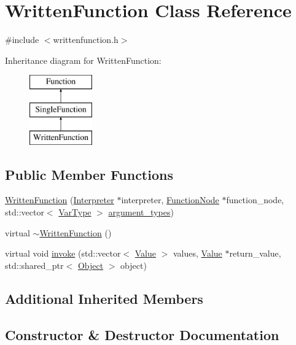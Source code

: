 \hypertarget{classWrittenFunction}{}\section{Written\+Function Class Reference}
\label{classWrittenFunction}


{\ttfamily \#include $<$writtenfunction.\+h$>$}

Inheritance diagram for Written\+Function\+:\begin{figure}[H]
\begin{center}
\leavevmode
\includegraphics[height=3.000000cm]{classWrittenFunction}
\end{center}
\end{figure}
\subsection*{Public Member Functions}
\begin{DoxyCompactItemize}
\item 
\hyperlink{classWrittenFunction_a39130c6e2a72622dfbe1a81ec07d5e4a}{Written\+Function} (\hyperlink{classInterpreter}{Interpreter} $\ast$interpreter, \hyperlink{classFunctionNode}{Function\+Node} $\ast$function\+\_\+node, std\+::vector$<$ \hyperlink{classVarType}{Var\+Type} $>$ \hyperlink{classSingleFunction_a345cc7c6a42587a62495688af6644a26}{argument\+\_\+types})
\item 
virtual \hyperlink{classWrittenFunction_a46facc10f998146c7709772b0b662ad6}{$\sim$\+Written\+Function} ()
\item 
virtual void \hyperlink{classWrittenFunction_afe56e5eb6a13f6e38ab5ec87e371d745}{invoke} (std\+::vector$<$ \hyperlink{classValue}{Value} $>$ values, \hyperlink{classValue}{Value} $\ast$return\+\_\+value, std\+::shared\+\_\+ptr$<$ \hyperlink{classObject}{Object} $>$ object)
\end{DoxyCompactItemize}
\subsection*{Additional Inherited Members}


\subsection{Constructor \& Destructor Documentation}
\mbox{\label{classWrittenFunction_a39130c6e2a72622dfbe1a81ec07d5e4a}} 
